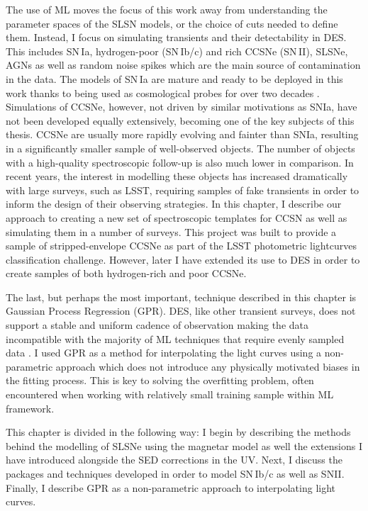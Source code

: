 The use of ML moves the focus of this work away from understanding the parameter spaces of the SLSN models, or the choice of cuts needed to define them. Instead, I focus on simulating transients and their detectability in DES. This includes SN\,Ia, hydrogen-poor (SN\,Ib/c) and rich CCSNe (SN\,II), SLSNe, AGNs as well as random noise spikes which are the main source of contamination in the data. The models of SN\,Ia are mature and ready to be deployed in this work \citep{Kessler2009,Kessler2015} thanks to being used as cosmological probes for over two decades \citep{Riess1998,Perlmutter1999}. Simulations of CCSNe, however, not driven by similar motivations as SNIa, have not been developed equally extensively, becoming one of the key subjects of this thesis. CCSNe are usually more rapidly evolving and fainter than SNIa, resulting in a significantly smaller sample of well-observed objects. The number of objects with a high-quality spectroscopic follow-up is also much lower in comparison. In recent years, the interest in modelling these objects has increased dramatically with large surveys, such as LSST, requiring samples of fake transients in order to inform the design of their observing strategies. In this chapter, I describe our approach to creating a new set of spectroscopic templates for CCSN as well as simulating them in a number of surveys. This project was built to provide a sample of stripped-envelope CCSNe as part of the LSST photometric lightcurves classification challenge. However, later I have extended its use to DES in order to create samples of both hydrogen-rich and poor CCSNe.

The last, but perhaps the most important, technique described in this chapter is Gaussian Process Regression (GPR). DES, like other transient surveys, does not support a stable and uniform cadence of observation making the data incompatible with the majority of ML techniques that require evenly sampled data \citep{Lochner2016}. I used GPR as a method for interpolating the light curves using a non-parametric approach which does not introduce any physically motivated biases in the fitting process. This is key to solving the overfitting problem, often encountered when working with relatively small training sample within ML framework.

This chapter is divided in the following way: I begin by describing the methods behind the modelling of SLSNe using the magnetar model as well the extensions I have introduced alongside the SED corrections in the UV. Next, I discuss the packages and techniques developed in order to model SN\,Ib/c as well as SNII. Finally, I describe GPR as a non-parametric approach to interpolating light curves.

